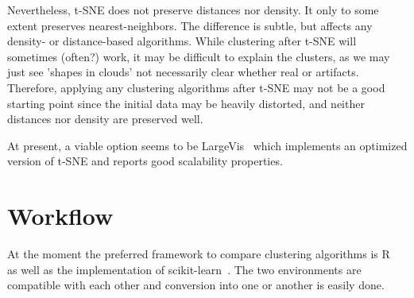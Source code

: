 Nevertheless, t-SNE does not preserve distances nor density. It only to some extent preserves nearest-neighbors. The difference is subtle, but affects any density- or distance-based algorithms.
While clustering after t-SNE will sometimes (often?) work, it may be difficult to explain the clusters, as we may just see 'shapes in clouds' not necessarily clear whether real or artifacts. Therefore, applying any clustering algorithms after t-SNE may not be a good starting point since the initial data may be heavily distorted, and neither distances nor density are preserved well.

At present, a viable option seems to be LargeVis~\cite{tang2016visualizing} which implements an optimized version of t-SNE and reports good scalability properties.

\section{Workflow}
At the moment the preferred framework to compare clustering algorithms is R~\cite{team2013r} as well as the implementation of scikit-learn~\cite{pedregosa2011scikit}. The two environments are compatible with each other and conversion into one or another is easily done.

